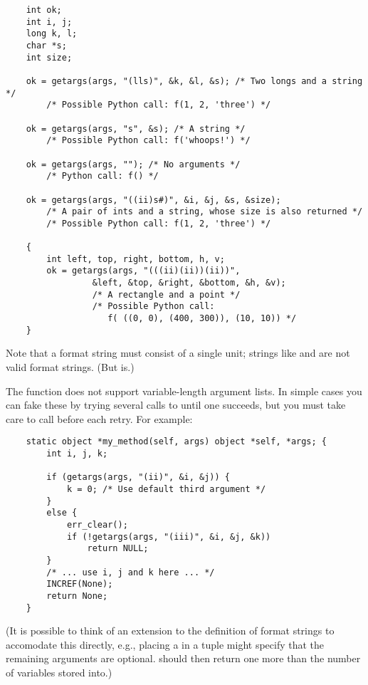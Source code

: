 \begin{verbatim}
    int ok;
    int i, j;
    long k, l;
    char *s;
    int size;

    ok = getargs(args, "(lls)", &k, &l, &s); /* Two longs and a string */
        /* Possible Python call: f(1, 2, 'three') */
    
    ok = getargs(args, "s", &s); /* A string */
        /* Possible Python call: f('whoops!') */

    ok = getargs(args, ""); /* No arguments */
        /* Python call: f() */
    
    ok = getargs(args, "((ii)s#)", &i, &j, &s, &size);
        /* A pair of ints and a string, whose size is also returned */
        /* Possible Python call: f(1, 2, 'three') */

    {
        int left, top, right, bottom, h, v;
        ok = getargs(args, "(((ii)(ii))(ii))",
                 &left, &top, &right, &bottom, &h, &v);
                 /* A rectangle and a point */
                 /* Possible Python call:
                    f( ((0, 0), (400, 300)), (10, 10)) */
    }
\end{verbatim}

Note that a format string must consist of a single unit; strings like
 and  are not valid format strings.  (But
 is.)

The  function does not support variable-length
argument lists.  In simple cases you can fake these by trying several
calls to
 until one succeeds, but you must take care to call
 before each retry.  For example:

\begin{verbatim}
    static object *my_method(self, args) object *self, *args; {
        int i, j, k;

        if (getargs(args, "(ii)", &i, &j)) {
            k = 0; /* Use default third argument */
        }
        else {
            err_clear();
            if (!getargs(args, "(iii)", &i, &j, &k))
                return NULL;
        }
        /* ... use i, j and k here ... */
        INCREF(None);
        return None;
    }
\end{verbatim}

(It is possible to think of an extension to the definition of format
strings to accomodate this directly, e.g., placing a \samp{|} in a
tuple might specify that the remaining arguments are optional.
 should then return one more than the number of
variables stored into.)

